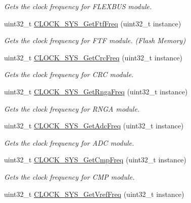 \begin{DoxyCompactItemize}
\begin{DoxyCompactList}\small\item\em Gets the clock frequency for F\+L\+E\+X\+B\+US module. \end{DoxyCompactList}\item 
uint32\+\_\+t \hyperlink{group__clock__manager_ga67253641c5328d030fc4119494ec76cf}{C\+L\+O\+C\+K\+\_\+\+S\+Y\+S\+\_\+\+Get\+Ftf\+Freq} (uint32\+\_\+t instance)
\begin{DoxyCompactList}\small\item\em Gets the clock frequency for F\+TF module. (Flash Memory) \end{DoxyCompactList}\item 
uint32\+\_\+t \hyperlink{group__clock__manager_gaf18bee112955313be8575195db194684}{C\+L\+O\+C\+K\+\_\+\+S\+Y\+S\+\_\+\+Get\+Crc\+Freq} (uint32\+\_\+t instance)
\begin{DoxyCompactList}\small\item\em Gets the clock frequency for C\+RC module. \end{DoxyCompactList}\item 
uint32\+\_\+t \hyperlink{group__clock__manager_ga140eb534d901ee4d99c962485cb17bca}{C\+L\+O\+C\+K\+\_\+\+S\+Y\+S\+\_\+\+Get\+Rnga\+Freq} (uint32\+\_\+t instance)
\begin{DoxyCompactList}\small\item\em Gets the clock frequency for R\+N\+GA module. \end{DoxyCompactList}\item 
uint32\+\_\+t \hyperlink{group__clock__manager_ga247779174c62073f7bcce9300cdab5cc}{C\+L\+O\+C\+K\+\_\+\+S\+Y\+S\+\_\+\+Get\+Adc\+Freq} (uint32\+\_\+t instance)
\begin{DoxyCompactList}\small\item\em Gets the clock frequency for A\+DC module. \end{DoxyCompactList}\item 
uint32\+\_\+t \hyperlink{group__clock__manager_ga77f491eb5ce05a09625287f590a8e2ed}{C\+L\+O\+C\+K\+\_\+\+S\+Y\+S\+\_\+\+Get\+Cmp\+Freq} (uint32\+\_\+t instance)
\begin{DoxyCompactList}\small\item\em Gets the clock frequency for C\+MP module. \end{DoxyCompactList}\item 
uint32\+\_\+t \hyperlink{group__clock__manager_ga76f1b1b8060bc48a6e030cdfa180503b}{C\+L\+O\+C\+K\+\_\+\+S\+Y\+S\+\_\+\+Get\+Vref\+Freq} (uint32\+\_\+t instance)

\end{DoxyCompactItemize}
